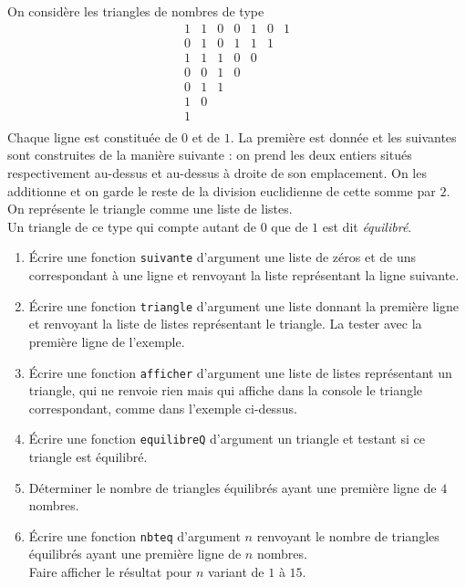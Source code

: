 \begin{exercice}
On considère les triangles de nombres de type
$$ \begin{array}{ccccccc}
1 & 1 & 0 & 0 & 1 & 0 & 1 \\
0 & 1 & 0 & 1 & 1 & 1 &   \\
1 & 1 & 1 & 0 & 0 &   &   \\
0 & 0 & 1 & 0 &   &   &   \\
0 & 1 & 1 &   &   &   &   \\
1 & 0 &   &   &   &   &   \\
1 &   &   &   &   &   &  \\
\end{array}$$
Chaque ligne est constituée de $0$ et de $1$. La première est donnée et les suivantes sont construites de la manière suivante : on prend les deux entiers situés respectivement au-dessus et au-dessus à droite de son emplacement. On les additionne et on garde le reste de la division euclidienne de cette somme par $2$.\\
On représente le triangle comme une liste de listes.\\
Un triangle de ce type qui compte autant de $0$ que de $1$ est dit \textit{équilibré}.
\begin{enumerate}
\item \'Ecrire une fonction \texttt{suivante} d'argument une liste de zéros et de uns correspondant à une ligne et renvoyant la liste représentant la ligne suivante. 
\item \'Ecrire une fonction \texttt{triangle} d'argument une liste donnant la première ligne et renvoyant la liste de listes représentant le triangle. La tester avec la première ligne de l'exemple.
\item \'Ecrire une fonction \texttt{afficher} d'argument une liste de listes représentant un triangle, qui ne renvoie rien mais qui affiche dans la console le triangle correspondant, comme dans l'exemple ci-dessus.
\item \'Ecrire une fonction \texttt{equilibreQ} d'argument un triangle et testant si ce triangle est équilibré.
\item Déterminer le nombre de triangles équilibrés ayant une première ligne de $4$ nombres.
\item \'Ecrire une fonction \texttt{nbteq} d'argument $n$ renvoyant le nombre de triangles équilibrés ayant une première ligne de $n$ nombres.\\
Faire afficher le résultat pour $n$ variant de $1$ à $15$.
\end{enumerate}
\end{exercice}



